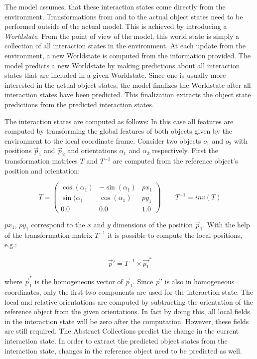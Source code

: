 The model assumes, that these interaction states come directly from the environment. Transformations from and to the actual object states need to be performed outside of the actual model. This is achieved by introducing a \textit{Worldstate}. From the point of view of the model, this world state is simply a collection of all interaction states in the environment. At each update from the environment, a new Worldstate is computed from the information provided. The model predicts a new Worldstate by making predictions about all interaction states that are included in a given Worldstate. Since one is usually more interested in the actual object states, the model finalizes the Worldstate after all interaction states have been predicted. This finalization extracts the object state predictions from the predicted interaction states. 

The interaction states are computed as follows:
In this case all features are computed by transforming the global features of both objects given by the environment to the local coordinate frame. Consider two objects $o_1$ and $o_2$ with positions $\vec{p}_1$ and $\vec{p}_2$ and orientations $\alpha_1$ and $\alpha_2$ respectively. First the transformation matrices $T$ and $T^{-1}$ are computed from the reference object's position and orientation:

\begin{equation}
T = \begin{pmatrix}
\cos(\alpha_1) & -\sin(\alpha_1) & px_1 \\
\sin(\alpha_) & \cos(\alpha_1) & py_1 \\
0.0 & 0.0 & 1.0
\end{pmatrix}
\qquad
T^{-1} = inv(T)
\end{equation}

$px_1$, $py_1$ correspond to the $x$ and $y$ dimensions of the position $\vec{p}_1$. With the help of the transformation matrix $T^{-1}$ it is possible to compute the local positions, e.g.:

\begin{equation}
\vec{p}' = T^{-1} \times \vec{p_1}^*
\end{equation}

where $\vec{p}_1^*$ is the homogeneous vector of $\vec{p}_1$. Since $\vec{p}'$ is also in homogeneous coordinates, only the first two components are used for the interaction state. The local and relative orientations are computed by subtracting the orientation of the reference object from the given orientations. In fact by doing this, all local fields in the interaction state will be zero after the computation. However, these fields are still required. The Abstract Collections predict the change in the current interaction state. In order to extract the predicted object states from the interaction state, changes in the reference object need to be predicted as well. 

